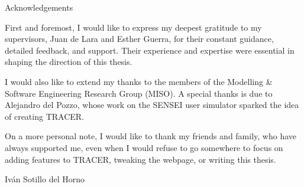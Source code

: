\thispagestyle{empty}

\vspace*{20mm}

\begin{center}
    { Acknowledgements}
\end{center}

First and foremost, I would like to express my deepest gratitude
to my supervisors, Juan de Lara and Esther Guerra,
for their constant guidance, detailed feedback, and support.
Their experience and expertise were essential
in shaping the direction of this thesis.

I would also like to extend my thanks to the members of
the Modelling \& Software Engineering Research Group (MISO).
A special thanks is due to Alejandro del Pozzo,
whose work on the SENSEI user simulator
sparked the idea of creating TRACER.

On a more personal note,
I would like to thank my friends and family,
who have always supported me, even when I would refuse to go somewhere to focus on
adding features to TRACER, tweaking the webpage, or writing this thesis.

\vspace{10mm}
\begin{flushright}
Iván Sotillo del Horno
\end{flushright}
\cleardoublepage{}
